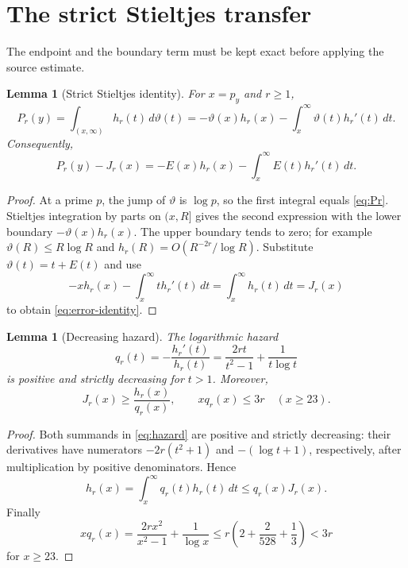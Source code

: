 \documentclass[11pt]{article}
\newtheorem{lemma}[theorem]{Lemma}
\theoremstyle{definition}
\theoremstyle{remark}
\begin{document}
\section{The strict Stieltjes transfer}

The endpoint and the boundary term must be kept exact before applying the
source estimate.

\begin{lemma}[Strict Stieltjes identity]
\label{lem:stieltjes}
For $x=p_y$ and $r\ge1$,
\begin{equation}
 P_r(y)=\int_{(x,\infty)}h_r(t)\,d\vartheta(t)
 =-\vartheta(x)h_r(x)-\int_x^\infty\vartheta(t)h_r'(t)\,dt.
 \label{eq:stieltjes}
\end{equation}
Consequently,
\begin{equation}
 P_r(y)-J_r(x)
 =-E(x)h_r(x)-\int_x^\infty E(t)h_r'(t)\,dt.
 \label{eq:error-identity}
\end{equation}
\end{lemma}

\begin{proof}
At a prime $p$, the jump of $\vartheta$ is $\log p$, so the first
integral equals \eqref{eq:Pr}.  Stieltjes integration by parts on
$(x,R]$ gives the second expression with the lower boundary
$-\vartheta(x)h_r(x)$.  The upper boundary tends to zero; for example
$\vartheta(R)\le R\log R$ and $h_r(R)=O(R^{-2r}/\log R)$.
Substitute $\vartheta(t)=t+E(t)$ and use
\[
 -xh_r(x)-\int_x^\infty t h_r'(t)\,dt
 =\int_x^\infty h_r(t)\,dt=J_r(x)
\]
to obtain \eqref{eq:error-identity}.
\end{proof}

\begin{lemma}[Decreasing hazard]
\label{lem:hazard}
The logarithmic hazard
\begin{equation}
 q_r(t)=-\frac{h_r'(t)}{h_r(t)}
 =\frac{2rt}{t^2-1}+\frac{1}{t\log t}
 \label{eq:hazard}
\end{equation}
is positive and strictly decreasing for $t>1$.  Moreover,
\begin{equation}
 J_r(x)\ge\frac{h_r(x)}{q_r(x)},\qquad
 xq_r(x)\le3r\quad(x\ge23).
 \label{eq:hazard-bounds}
\end{equation}
\end{lemma}

\begin{proof}
Both summands in \eqref{eq:hazard} are positive and strictly decreasing:
their derivatives have numerators $-2r(t^2+1)$ and
$-(\log t+1)$, respectively, after multiplication by positive
denominators.  Hence
\[
 h_r(x)=\int_x^\infty q_r(t)h_r(t)\,dt
 \le q_r(x)J_r(x).
\]
Finally
\[
 xq_r(x)=\frac{2rx^2}{x^2-1}+\frac1{\log x}
 \le r\left(2+\frac{2}{528}+\frac13\right)<3r
\]
for $x\ge23$.
\end{proof}
\end{document}
